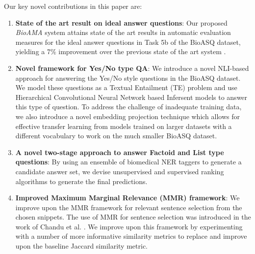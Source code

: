 Our key novel contributions in this paper are:
\begin{enumerate}
    \item \textbf{State of the art result on ideal answer questions}: Our proposed \textit{BioAMA} system attains state of the art results in automatic evaluation measures for the ideal answer questions in Task 5b of the BioASQ dataset, yielding a 7\%  improvement over the previous state of the art system \cite{khyati-paper}.
    \item \textbf{Novel framework for Yes/No type QA}: 
    We introduce a novel NLI-based approach for answering the Yes/No style questions in the BioASQ dataset. We model these questions as a Textual Entailment (TE) problem and use Hierarchical Convolutional Neural Network based Infersent models \cite{Infersent} to answer this type of question. To address the challenge of inadequate training data, we also introduce a novel embedding projection technique which allows for effective transfer learning from models trained on larger datasets with a different vocabulary to work on the much smaller BioASQ dataset.
    \item \textbf{A novel two-stage approach to answer Factoid and List type questions}: 
    By using an ensemble of biomedical NER taggers to generate a candidate answer set, we devise unsupervised and supervised ranking algorithms to generate the final predictions.
    \item \textbf{Improved Maximum Marginal Relevance (MMR) framework}: We improve upon the MMR framework for relevant sentence selection from the chosen snippets. The use of MMR for sentence selection was introduced in the work of Chandu et al. . We improve upon this framework by experimenting with a number of more informative similarity metrics to replace and improve upon the baseline Jaccard similarity metric.

\end{enumerate}
